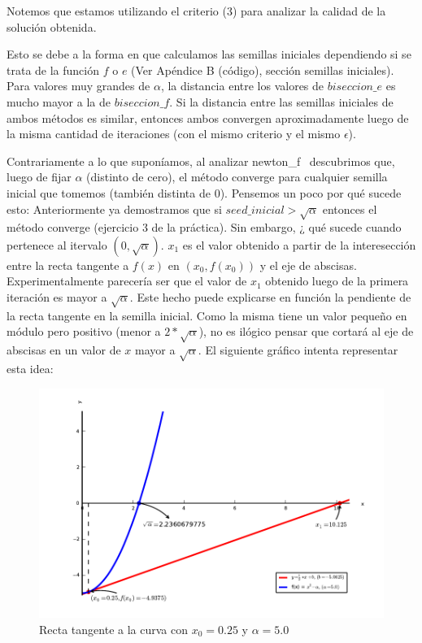 Notemos que estamos utilizando el criterio (3) para analizar la calidad de la solución obtenida.

Esto se debe a la forma en que calculamos las semillas iniciales dependiendo si se trata de la función $f$ o $e$ (Ver Apéndice B (código), sección semillas iniciales). Para valores muy grandes de $\alpha$,
la distancia entre los valores de $biseccion\_e$ es mucho mayor a la de $biseccion\_f$. Si la distancia entre las semillas iniciales de ambos métodos es similar, entonces ambos convergen aproximadamente
luego de la misma cantidad de iteraciones (con el mismo criterio y el mismo $\epsilon$).

Contrariamente a lo que suponíamos, al analizar newton\_f \ descubrimos que, luego de fijar $\alpha$ (distinto de cero), el método converge para cualquier semilla inicial que tomemos (también distinta de 0).
Pensemos un poco por qué sucede esto: 
Anteriormente ya demostramos que si $seed\_inicial > \sqrt{\alpha}$ entonces el método converge (ejercicio 3 de la práctica). 
Sin embargo, ¿ qué sucede cuando pertenece al itervalo $(0,\sqrt{\alpha})$. $x_1$ es el valor 
obtenido a partir de la interesección entre la recta tangente a $f(x)$ en $(x_0,f(x_0))$ y el eje de abscisas. Experimentalmente parecería ser que el valor de $x_1$ obtenido luego de la primera 
iteración es mayor a $\sqrt{\alpha}$. Este hecho puede explicarse en función la pendiente de la recta tangente en la semilla inicial. Como la misma tiene un valor peque\~no en módulo pero positivo
(menor a $2*\sqrt{\alpha}$), no es ilógico pensar que cortará al eje de abscisas en un valor de $x$ mayor a  $\sqrt{\alpha}$. El siguiente gráfico intenta representar esta idea:  

\begin{figure}[!h]
	\begin{center}
		  \includegraphics[keepaspectratio]{../Imagenes/exp1/recta_tangente.pdf}
		  \caption{Recta tangente a la curva con $x_0=0.25$ y $\alpha=5.0$}
		  \label{fig:contra1}
	\end{center}
\end{figure}
\FloatBarrier


